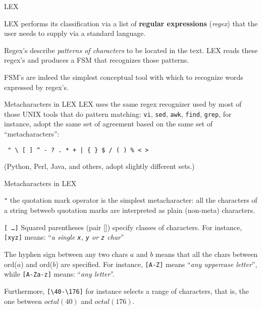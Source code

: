 \begin{frame}[fragile]{LEX}

LEX performs its classification via a list of 
{\bf regular expressions} ({\em regex\/}) that the user needs
to supply via a standard language.


\vspace{20pt}

Regex's describe \emph{patterns of characters\/} to be
located in the text. LEX reads these regex's and produces a
FSM that recognizes those patterns.

\vspace{20pt}


FSM's are indeed the simplest conceptual tool
with which to recognize words expressed by regex's.

\end{frame}
\begin{frame}[fragile]{Metacharacters in LEX}
LEX uses the same regex recognizer used by most of those UNIX tools
that do pattern matching: 
{\tt vi}, {\tt sed}, {\tt awk}, {\tt find}, {\tt grep}, 
for instance, adopt the same set of agreement based on the same set of
``metacharacters'':


\vspace{20pt}

\verb! " \ [ ] ^ - ? . * + | { } $ / ( ) % < >!


\vspace{20pt}

(Python, Perl, Java, and others, adopt slightly different sets.)



\end{frame}
\begin{frame}[fragile]{Metacharacters in LEX}

\begin{description}
\item{\tt "}
        the quotation mark operator is the simplest metacharacter:
	all the characters of a string betweeb quotation marks are
	interpreted as plain (non-meta) characters.
\item{\tt [ \ldots ]}
        Squared parentheses (pair []) specify classes of characters.
	For instance,
        {\tt [xyz]} means:
        ``{\em a single {\tt x}, {\tt y} or {\tt z} char}''

	The hyphen sign between any two chars $a$ and $b$ means that all the
	chars between ord($a$) and ord($b$) are specified.
	For instance,
        {\tt [A-Z]} means
        ``{\em any uppercase letter\/}'', while
        {\tt [A-Za-z]} means: ``{\em any letter\/}''.

	Furthermore, \verb"[\40-\176]" for instance selects
	a range of characters, that is, the one between
	$octal(40)$ and $octal(176)$.
\end{description}

\end{frame}
